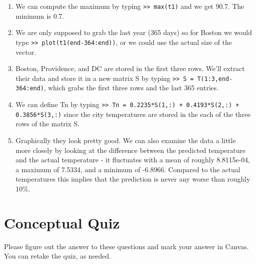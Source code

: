 \begin{sol}
\begin{enumerate}
        \item We can compute the maximum by typing \texttt{>> max(t1)} and we get 90.7. The minimum is 0.7.
        
        \item We are only supposed to grab the last year (365 days) so for Boston we would type \texttt{>> plot(t1(end-364:end))}, or we could use the actual size of the vector.
        
        \item Boston, Providence, and DC are stored in the first three rows. We'll extract their data and store it in a new matrix S by typing \texttt{>> S = T(1:3,end-364:end)}, which grabs the first three rows and the last 365 entries.
        
        \item We can define Tn by typing \texttt{>> Tn = 0.2235*S(1,:) + 0.4193*S(2,:) + 0.3856*S(3,:)} since the city temperatures are stored in the each of the three rows of the matrix S.
        
        \item Graphically they look pretty good. We can also examine the data a little more closely by looking at the difference between the predicted temperature and the actual temperature - it fluctuates with a mean of roughly 8.8115e-04, a maximum of 7.5334, and a minimum of -6.8966. Compared to the actual temperatures this implies that the prediction is never any worse than roughly 10\%.
\end{enumerate}
\end{sol}

\section{Conceptual Quiz}
Please figure out the answer to these questions and mark your answer in Canvas. You can retake the quiz, as needed.

